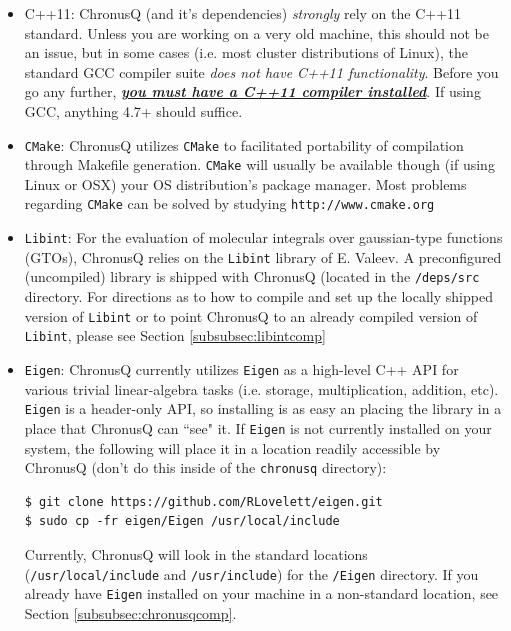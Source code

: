 \documentclass[12pt]{article}
\begin{document}
\begin{itemize}
\item C++11: ChronusQ (and it's dependencies) \emph{strongly} rely on the C++11 standard. Unless you are working on a very old machine, this should not be an issue, but in some cases (i.e. most cluster distributions of Linux), the standard GCC compiler suite \emph{does not have C++11 functionality}. Before you go any further, \emph{\textbf{\underline{you must have a C++11 compiler installed}}}. If using GCC, anything 4.7+ should suffice.

\item \texttt{CMake}: ChronusQ utilizes \texttt{CMake} to facilitated portability of compilation through Makefile generation. \texttt{CMake} will usually be available though (if using Linux or OSX) your OS distribution's package manager. Most problems regarding \texttt{CMake} can be solved by studying \texttt{http://www.cmake.org}

\item \texttt{Libint}: For the evaluation of molecular integrals over gaussian-type functions (GTOs), ChronusQ relies on the \texttt{Libint} library of E. Valeev. A preconfigured (uncompiled) library is shipped with ChronusQ (located in the \texttt{/deps/src} directory. For directions as to how to compile and set up the locally shipped version of \texttt{Libint} or to point ChronusQ to an already compiled version of \texttt{Libint}, please see Section \ref{subsubsec:libintcomp}

\item \texttt{Eigen}: ChronusQ currently utilizes \texttt{Eigen} as a high-level C++ API for various trivial linear-algebra tasks (i.e. storage, multiplication, addition, etc). \texttt{Eigen} is a header-only API, so installing is as easy an placing the library in a place that ChronusQ can ``see" it. If \texttt{Eigen} is not currently installed on your system, the following will place it in a location readily accessible by ChronusQ (don't do this inside of the \texttt{chronusq} directory):
\begin{lstlisting}
$ git clone https://github.com/RLovelett/eigen.git
$ sudo cp -fr eigen/Eigen /usr/local/include
\end{lstlisting}
Currently, ChronusQ will look in the standard locations (\texttt{/usr/local/include} and \texttt{/usr/include}) for the \texttt{/Eigen} directory. If you already have \texttt{Eigen} installed on your machine in a non-standard location, see Section \ref{subsubsec:chronusqcomp}.


\end{itemize}
\end{document}
